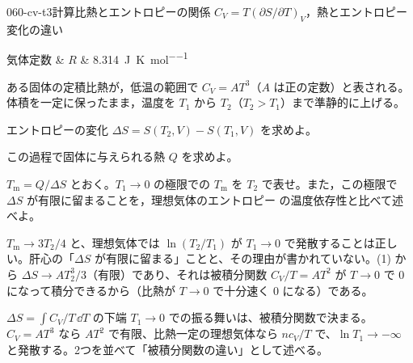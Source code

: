 \documentclass[uplatex,dvipdfmx,a4paper,11pt]{jsarticle}
\begin{document}
\mondaihen
{}
\begin{mondai}{060-cv-t3}{計算}{比熱とエントロピーの関係 $C_{V} = T(\partial S/\partial T)_{V}$，熱とエントロピー変化の違い}
\begin{teisuu}
  気体定数 & $R$ & \qty{8.314}{\joule\per\kelvin\per\mole}\\
\end{teisuu}
ある固体の定積比熱が，低温の範囲で $C_{V} = AT^{3}$（$A$ は正の定数）と表される。体積を一定に保ったまま，温度を $T_{1}$ から $T_{2}$（$T_{2} > T_{1}$）まで準静的に上げる。
  \begin{shoumon}
    \item エントロピーの変化 $\Delta S = S(T_{2},V) - S(T_{1},V)$ を求めよ。
    \item この過程で固体に与えられる熱 $Q$ を求めよ。
    \item $T_{\mathrm{m}} = Q/\Delta S$ とおく。$T_{1} \to 0$ の極限での $T_{\mathrm{m}}$ を $T_{2}$ で表せ。また，この極限で $\Delta S$ が有限に留まることを，理想気体のエントロピー  の温度依存性と比べて述べよ。
  \end{shoumon}

\begin{kotaeran}
   $T_{\mathrm{m}}\to 3T_{2}/4$ と、理想気体では $\ln(T_{2}/T_{1})$ が $T_{1}\to0$ で発散することは正しい。肝心の「$\Delta S$ が有限に留まる」ことと、その理由が書かれていない。(1) から $\Delta S\to AT_{2}^{3}/3$（有限）であり、それは被積分関数 $C_{V}/T=AT^{2}$ が $T\to0$ で $0$ になって積分できるから（比熱が $T\to0$ で十分速く $0$ になる）である。
\end{kotaeran}
\begin{rikai}
  \item $\Delta S=\int C_{V}/T\,\dd T$ の下端 $T_{1}\to0$ での振る舞いは、被積分関数で決まる。$C_{V}=AT^{3}$ なら $AT^{2}$ で有限、比熱一定の理想気体なら $nc_{V}/T$ で、$\ln T_{1}\to-\infty$ と発散する。2つを並べて「被積分関数の違い」として述べる。
\end{rikai}
\end{mondai}
\end{document}
